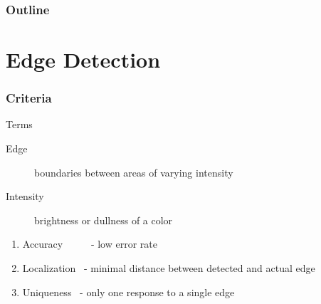 \documentclass{beamer}
\newcommand{\linespace}{\vskip 0.25cm}
\begin{document}
\begin{frame}
  \frametitle{Outline}
  \tableofcontents[hideallsubsections]
\end{frame}

\section[Edge Detection]{Edge Detection}

\begin{frame}
\frametitle{Criteria}
Terms
\begin{description}
\item[Edge] boundaries between areas of varying intensity
\item[Intensity] brightness or dullness of a color
\end{description}
\linespace
\linespace
\begin{enumerate}
\item Accuracy \ \ \ \ \ - low error rate
\item Localization \ - minimal distance between detected and actual edge
\item Uniqueness \ - only one response to a single edge
\end{enumerate}
\end{frame}
\end{document}
